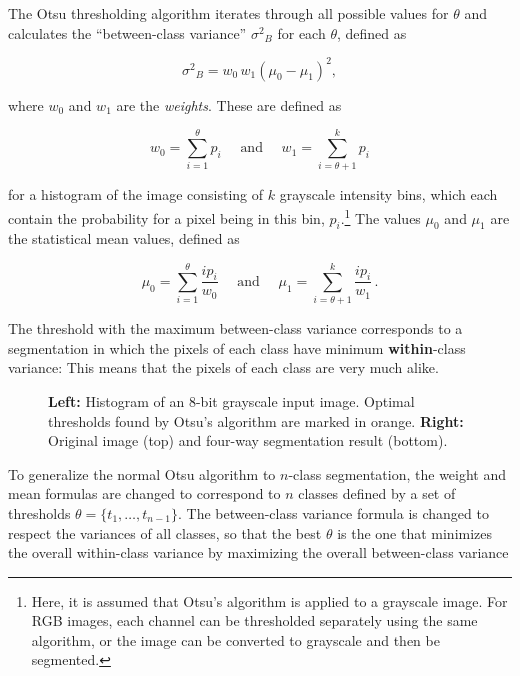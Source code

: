 \noindent The Otsu thresholding algorithm \cite{Otsu} iterates through all possible values for $\theta$ and calculates the ``between-class variance'' ${\sigma^{2}}_B$ for each $\theta$, defined as

\[ {\sigma^2}_{B} = w_0 \, w_1 (\mu_0 - \mu_1)^2,\]

\noindent where $w_0$ and $w_1$ are the \textit{weights}. These are defined as

\[ w_0 = \sum \limits_{i=1}^{\theta} p_i \quad \text{ and } \quad w_1 = \sum \limits_{i=\theta+1}^{k} p_i \]

\noindent for a histogram of the image consisting of $k$ grayscale intensity bins, which each contain the probability for a pixel being in this bin, $p_i$.\footnote{Here, it is assumed that Otsu's algorithm is applied to a grayscale image. For RGB images, each channel can be thresholded separately using the same algorithm, or the image can be converted to grayscale and then be segmented.} The values $\mu_0$ and $\mu_1$ are the statistical mean values, defined as

\[ \mu_0 = \sum \limits_{i=1}^{\theta} \frac{i p_i}{w_0} \quad \text{ and } \quad \mu_1 = \sum \limits_{i=\theta + 1}^{k} \frac{i p_i}{w_1} \,. \]

\noindent The threshold with the maximum between-class variance corresponds to a segmentation in which the pixels of each class have minimum \textbf{within}-class variance: This means that the pixels of each class are very much alike.

\begin {figure}[!htb]
	\begin {subfigure}[t]{0.3\linewidth}
	\end {subfigure}
	\hspace{5.5cm}
	\begin {subfigure}[b]{0.3\linewidth}
	\end {subfigure}
		\caption[]{\textbf{Left:} Histogram of an 8-bit grayscale input image. Optimal thresholds found by Otsu's algorithm are marked in orange. \textbf{Right:} Original image (top) and four-way segmentation result (bottom).}
		\label{fig:otsu}
	\end {figure}

\noindent To generalize the normal Otsu algorithm to $n$-class segmentation, the weight and mean formulas are changed to correspond to $n$ classes defined by a set of thresholds $\theta = \{t_1, \dots, t_{n-1}\}$. The between-class variance formula is changed to respect the variances of all classes, so that the best $\theta$ is the one that minimizes the overall within-class variance by maximizing the overall between-class variance

